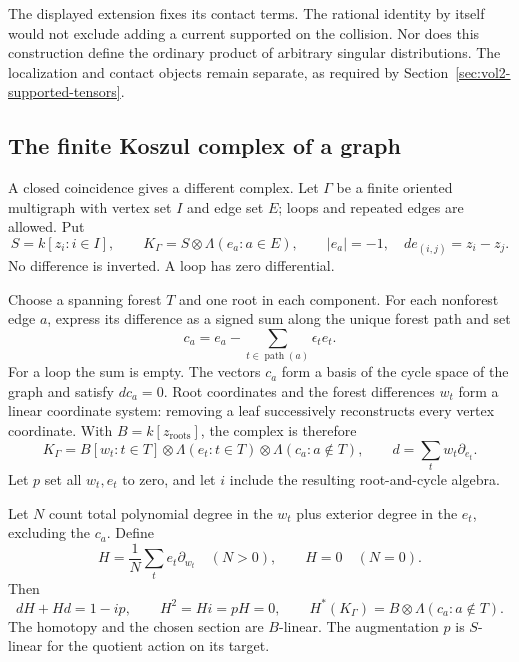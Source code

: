 The displayed extension fixes its contact terms. The rational
identity by itself would not exclude adding a current supported on
the collision. Nor does this construction define the ordinary product
of arbitrary singular distributions. The localization and contact
objects remain separate, as required by
Section~\ref{sec:vol2-supported-tensors}.

\subsection{The finite Koszul complex of a graph}

A closed coincidence gives a different complex. Let $\Gamma$ be
a finite oriented multigraph with vertex set $I$ and edge set $E$;
loops and repeated edges are allowed. Put
\begin{equation}\label{eq:vol2-graph-koszul}
 S=k[z_i:i\in I],\qquad
 K_\Gamma=S\otimes\Lambda(e_a:a\in E),\qquad
 |e_a|=-1,\quad de_{(i,j)}=z_i-z_j.
\end{equation}
No difference is inverted. A loop has zero differential.

Choose a spanning forest $T$ and one root in each component.
For each nonforest edge $a$, express its difference as a signed
sum along the unique forest path and set
\[
 c_a=e_a-\sum_{t\in\operatorname{path}(a)}\epsilon_t e_t.
\]
For a loop the sum is empty. The vectors $c_a$ form a basis of the
cycle space of the graph and satisfy $dc_a=0$.
Root coordinates and the forest differences $w_t$ form a linear
coordinate system: removing a leaf successively reconstructs every
vertex coordinate. With $B=k[z_{\mathrm{roots}}]$, the complex is
therefore
\[
 K_\Gamma=B[w_t:t\in T]\otimes\Lambda(e_t:t\in T)
                          \otimes\Lambda(c_a:a\notin T),
 \qquad d=\sum_tw_t\partial_{e_t}.
\]
Let $p$ set all $w_t,e_t$ to zero, and let $i$ include the resulting
root-and-cycle algebra.

\begin{proposition}
\label{prop:vol2-graph-contraction}
Let $N$ count total polynomial degree in the $w_t$ plus exterior
degree in the $e_t$, excluding the $c_a$. Define
\[
 H=\frac1N\sum_te_t\partial_{w_t}\quad(N>0),
 \qquad H=0\quad(N=0).
\]
Then
\[
 dH+Hd=1-ip,\qquad H^2=Hi=pH=0,
 \qquad H^*(K_\Gamma)=B\otimes\Lambda(c_a:a\notin T).
\]
The homotopy and the chosen section are $B$-linear. The augmentation
$p$ is $S$-linear for the quotient action on its target.
\end{proposition}

